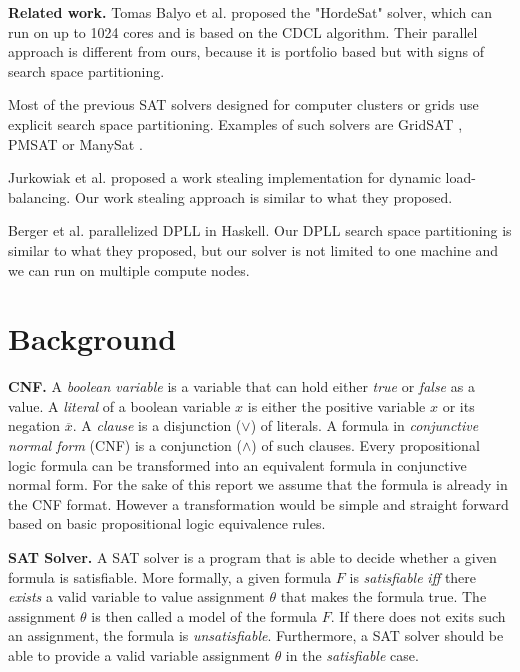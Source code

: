 \documentclass[letterpaper]{article}
\newcommand{\mypar}[1]{{\bf #1.}}
\begin{document}
\mypar{Related work}
Tomas Balyo et al. proposed the "HordeSat" solver, which can run on up to 1024 cores and is based on the CDCL algorithm.
Their parallel approach is different from ours, because it is portfolio based but with signs of search space partitioning. \cite{hordesat}

Most of the previous SAT solvers designed for computer clusters or grids use explicit search space partitioning.
Examples of such solvers are GridSAT \cite{gridsat}, PMSAT \cite{pmsat} or ManySat \cite{manysat}.

Jurkowiak et al. proposed a work stealing implementation for dynamic load-balancing. \cite{stealing}
Our work stealing approach is similar to what they proposed.

Berger et al. parallelized DPLL in Haskell. \cite{dpll_haskell}
Our DPLL search space partitioning is similar to what they proposed, but our solver is not limited to one machine and we can run on multiple compute nodes.

\section{Background}\label{sec:background}

\mypar{CNF}
A \textit{boolean variable} is a variable that can hold either \textit{true} or \textit{false} as a value.
A \textit{literal} of a boolean variable $x$ is either the positive variable $x$ or its negation $\overline{x}$.
A \textit{clause} is a disjunction ($\lor$) of literals.
A formula in \textit{conjunctive normal form} (CNF) is a conjunction ($\land$) of such clauses.
Every propositional logic formula can be transformed into an equivalent formula in conjunctive normal form.
For the sake of this report we assume that the formula is already in the CNF format.
However a transformation would be simple and straight forward based on basic propositional logic equivalence rules.

\mypar{SAT Solver}
A SAT solver is a program that is able to decide whether a given formula is satisfiable.
More formally, a given formula $F$ is \textit{satisfiable} \textit{iff} there \textit{exists} a valid variable to value assignment $\theta$ that makes the formula true.
The assignment $\theta$ is then called a model of the formula $F$.
If there does not exits such an assignment, the formula is \textit{unsatisfiable}.
Furthermore, a SAT solver should be able to provide a valid variable assignment $\theta$ in the \textit{satisfiable} case.
\end{document}
